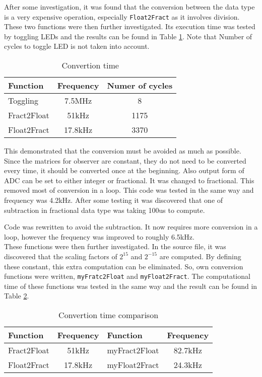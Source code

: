 After some investigation, it was found that the conversion between the data type is a very expensive operation, especially \texttt{Float2Fract} as it involves division. These two functions were then further investigated. Its execution time was tested by toggling LEDs and the results can be found in Table \ref{tab:conversion}. Note that Number of cycles to toggle LED is not taken into account. 

\begin{table}[h]
\centering
\begin{tabular}{|p{4cm} | c | c|}
\hline
Function    & Frequency & Numer of cycles\\ \hline \hline
Toggling    & 7.5MHz    & 8\\ \hline
Fract2Float & 51kHz     & 1175\\ \hline
Float2Fract & 17.8kHz   & 3370\\ \hline
\end{tabular}
\caption{Convertion time}
\label{tab:conversion}
\end{table}

This demonstrated that the conversion must be avoided as much as possible. Since the matrices for observer are constant, they do not need to be converted every time, it should be converted once at the beginning. Also output form of ADC can be set to either integer or fractional. It was changed to fractional. This removed most of conversion in a loop. This code was tested in the same way and frequency was 4.2kHz. After some testing it was discovered that one of subtraction in fractional data type was taking 100us to compute.

Code was rewritten to avoid the subtraction. It now requires more conversion in a loop, however the frequency was improved to roughly 6.5kHz.\\

These functions were then further investigated. In the source file, it was discovered that the scaling factors of $2^{15}$ and $2^{-15}$ are computed. By defining these constant, this extra computation can be eliminated. So, own conversion functions were written, \texttt{myFratc2Float} and \texttt{myFloat2Fract}. The computational time of these functions was tested in the same way and the result can be found in Table \ref{tab:conversion2}.

\begin{table}[h]
\centering
\begin{tabular}{|p{4cm} | c | p{4cm} | c |}
\hline
Function    & Frequency & Function       & Frequency \\ \hline \hline
Fract2Float & 51kHz     & myFract2Float  & 82.7kHz\\ \hline
Float2Fract & 17.8kHz   & myFloat2Fract  & 24.3kHz\\ \hline
\end{tabular}
\caption{Convertion time comparison}
\label{tab:conversion2}
\end{table}

